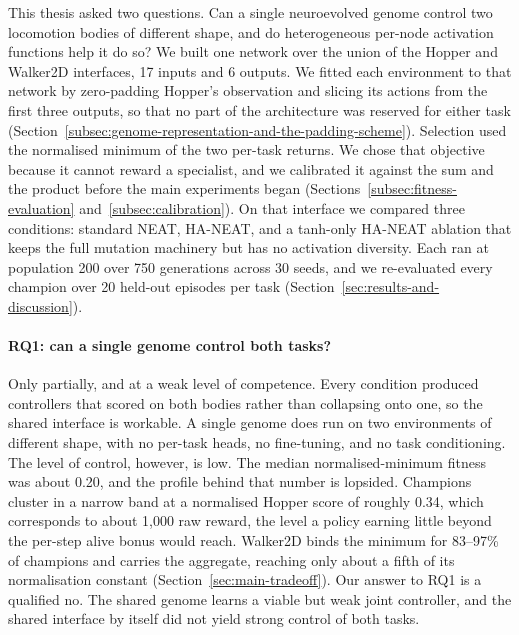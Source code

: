 \documentclass[12pt]{article}
\begin{document}
This thesis asked two questions. Can a single neuroevolved genome control two locomotion bodies of different shape, and do heterogeneous per-node activation functions help it do so?
We built one network over the union of the Hopper and Walker2D interfaces, 17 inputs and 6 outputs. We fitted each environment to that network by zero-padding Hopper's observation and slicing its actions from the first three outputs, so that no part of the architecture was reserved for either task (Section~\ref{subsec:genome-representation-and-the-padding-scheme}).
Selection used the normalised minimum of the two per-task returns. We chose that objective because it cannot reward a specialist, and we calibrated it against the sum and the product before the main experiments began (Sections~\ref{subsec:fitness-evaluation} and~\ref{subsec:calibration}).
On that interface we compared three conditions: standard NEAT, HA-NEAT, and a tanh-only HA-NEAT ablation that keeps the full mutation machinery but has no activation diversity. Each ran at population 200 over 750 generations across 30 seeds, and we re-evaluated every champion over 20 held-out episodes per task (Section~\ref{sec:results-and-discussion}).

\paragraph{RQ1: can a single genome control both tasks?}
Only partially, and at a weak level of competence.
Every condition produced controllers that scored on both bodies rather than collapsing onto one, so the shared interface is workable. A single genome does run on two environments of different shape, with no per-task heads, no fine-tuning, and no task conditioning.
The level of control, however, is low.
The median normalised-minimum fitness was about 0.20, and the profile behind that number is lopsided.
Champions cluster in a narrow band at a normalised Hopper score of roughly 0.34, which corresponds to about 1{,}000 raw reward, the level a policy earning little beyond the per-step alive bonus would reach.
Walker2D binds the minimum for 83--97\% of champions and carries the aggregate, reaching only about a fifth of its normalisation constant (Section~\ref{sec:main-tradeoff}).
Our answer to RQ1 is a qualified no. The shared genome learns a viable but weak joint controller, and the shared interface by itself did not yield strong control of both tasks.
\end{document}
